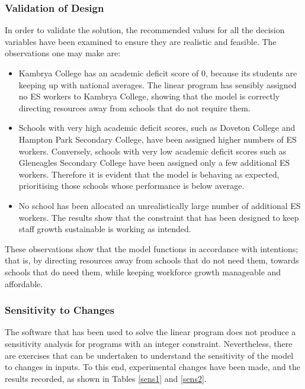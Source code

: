 \documentclass[11pt, a4paper]{article}
\begin{document}
    \subsubsection{Validation of Design}

    In order to validate the solution, the recommended values for all the decision variables have been examined to ensure they are realistic and feasible. The observations one may make are:
    
    \begin{itemize}
        \item Kambrya College has an academic deficit score of 0, because its students are keeping up with national averages. The linear program has sensibly assigned no ES workers to Kambrya College, showing that the model is correctly directing resources away from schools that do not require them.
        \item Schools with very high academic deficit scores, such as Doveton College and Hampton Park Secondary College, have been assigned higher numbers of ES workers. Conversely, schools with very low academic deficit scores such as Gleneagles Secondary College have been assigned only a few additional ES workers. Therefore it is evident that the model is behaving as expected, prioritising those schools whose performance is below average.
        \item No school has been allocated an unrealistically large number of additional ES workers. The results show that the constraint that has been designed to keep staff growth sustainable is working as intended.
    \end{itemize}

    These observations show that the model functions in accordance with intentions; that is, by directing resources away from schools that do not need them, towards schools that do need them, while keeping workforce growth manageable and affordable.

    \subsubsection{Sensitivity to Changes}    
    
    The software that has been used to solve the linear program does not produce a sensitivity analysis for programs with an integer constraint. Nevertheless, there are exercises that can be undertaken to understand the sensitivity of the model to changes in inputs. To this end, experimental changes have been made, and the results recorded, as shown in Tables \ref{sens1} and \ref{sens2}.
\end{document}
